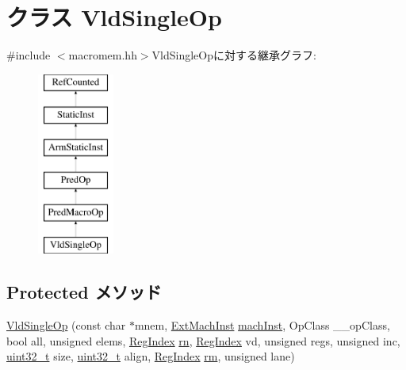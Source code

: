 \hypertarget{classArmISA_1_1VldSingleOp}{
\section{クラス VldSingleOp}
\label{classArmISA_1_1VldSingleOp}
}


{\ttfamily \#include $<$macromem.hh$>$}VldSingleOpに対する継承グラフ:\begin{figure}[H]
\begin{center}
\leavevmode
\includegraphics[height=6cm]{classArmISA_1_1VldSingleOp}
\end{center}
\end{figure}
\subsection*{Protected メソッド}
\begin{DoxyCompactItemize}
\item 
\hyperlink{classArmISA_1_1VldSingleOp_a2047790d9f83b99ba811392cb8b947b4}{VldSingleOp} (const char $\ast$mnem, \hyperlink{classStaticInst_a5605d4fc727eae9e595325c90c0ec108}{ExtMachInst} \hyperlink{classStaticInst_a744598b194ca3d4201d9414ce4cc4af4}{machInst}, OpClass \_\-\_\-opClass, bool all, unsigned elems, \hyperlink{classStaticInst_a36d25e03e43fa3bb4c5482cbefe5e0fb}{RegIndex} \hyperlink{namespaceArmISA_adf8c6c579ad8729095a637a4f2181211}{rn}, \hyperlink{classStaticInst_a36d25e03e43fa3bb4c5482cbefe5e0fb}{RegIndex} vd, unsigned regs, unsigned inc, \hyperlink{Type_8hh_a435d1572bf3f880d55459d9805097f62}{uint32\_\-t} size, \hyperlink{Type_8hh_a435d1572bf3f880d55459d9805097f62}{uint32\_\-t} align, \hyperlink{classStaticInst_a36d25e03e43fa3bb4c5482cbefe5e0fb}{RegIndex} \hyperlink{namespaceArmISA_ad546c2cf2168cf2d8ac21b2a9f485e82}{rm}, unsigned lane)
\end{DoxyCompactItemize}


